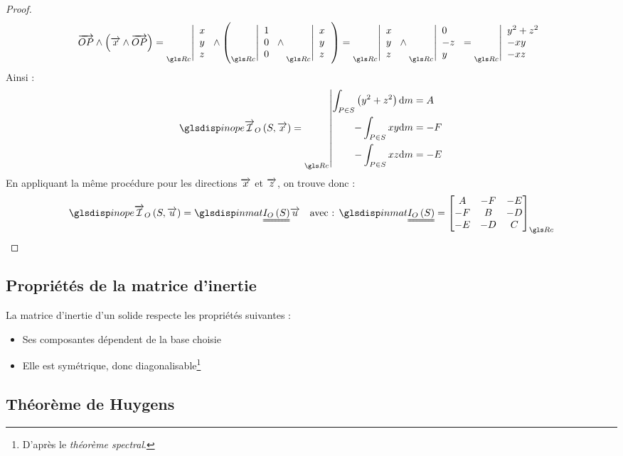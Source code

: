 \begin{proof}
		\begin{equation*}
			\vect{OP}\wedge\left(\vect{x}\wedge\vect{OP}\right)=
				\coords{x}{y}{z}
				\wedge
				\left(
					\coords{1}{0}{0}			
					\wedge
					\coords{x}{y}{z}
				\right)
				=
				\coords{x}{y}{z}
				\wedge
				\coords{0}{-z}{y}
				=
				\coords{y^2+z^2}{-xy}{-xz}						
		\end{equation*}
		Ainsi :
		\begin{equation*}
			\inope{S}{\vect{x}}=
			\prescript{}{\Rc}{\left|
				\begin{aligned}
					\ints{\left(y^2+z^2\right)}	&=A\\
					-\ints{xy}					&=-F\\
					-\ints{xz}					&=-E\\
				\end{aligned}
			\right.}
		\end{equation*}
		En appliquant la même procédure pour les directions $\overrightarrow{x}$ et $\overrightarrow{z}$, on trouve donc :
		\begin{equation*}
			\inope{S}{\vect{u}}=\inmat{S}\vect{u} \quad \text{avec : }
			\inmat{S}=\incomp{A}{B}{C}{D}{E}{F}
		\end{equation*}
	\end{proof}
	
	\subsection{Propriétés de la matrice d'inertie}
	La matrice d'inertie d'un solide respecte les propriétés suivantes :
		\begin{itemize}
			\item Ses composantes dépendent de la base choisie
			\item Elle est symétrique, donc diagonalisable\footnote{D'après le \emph{théorème spectral}.}
		\end{itemize}
		
\subsection{Théorème de Huygens}
\begin{theorem}
\end{theorem}

